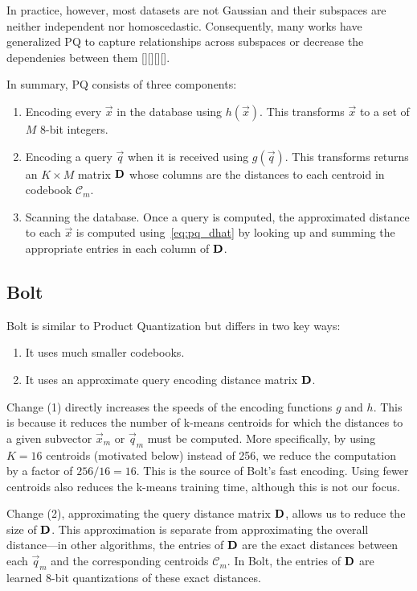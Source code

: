 In practice, however, most datasets are not Gaussian and their subspaces are neither independent nor homoscedastic. Consequently, many works have generalized PQ to capture relationships across subspaces or decrease the dependenies between them [][][][].

In summary, PQ consists of three components:
\begin{enumerate}
    \item Encoding every $\vec{x}$ in the database using $h(\vec{x})$. This transforms $\vec{x}$ to a set of $M$ 8-bit integers.
    \item Encoding a query $\vec{q}$ when it is received using $g(\vec{q})$. This transforms returns an $K \times M$ matrix $\mathbf{D}$ whose columns are the distances to each centroid in codebook $\mathcal{C}_m$.
    \item Scanning the database. Once a query is computed, the approximated distance to each $\vec{x}$ is computed using~\ref{eq:pq_dhat} by looking up and summing the appropriate entries in each column of $\mathbf{D}$.
\end{enumerate}

\subsection{Bolt}

Bolt is similar to Product Quantization but differs in two key ways:
\begin{enumerate}
\item It uses much smaller codebooks.
\item It uses an approximate query encoding distance matrix $\mathbf{D}$.
\end{enumerate}

Change (1) directly increases the speeds of the encoding functions $g$ and $h$. This is because it reduces the number of k-means centroids for which the distances to a given subvector $\vec{x}_m$ or $\vec{q}_m$ must be computed. More specifically, by using $K = 16$ centroids (motivated below) instead of 256, we reduce the computation by a factor of $256 / 16 = 16$. This is the source of Bolt's fast encoding. Using fewer centroids also reduces the k-means training time, although this is not our focus.

Change (2), approximating the query distance matrix $\mathbf{D}$, allows us to reduce the size of $\mathbf{D}$. This approximation is separate from approximating the overall distance---in other algorithms, the entries of $\mathbf{D}$ are the exact distances between each $\vec{q}_m$ and the corresponding centroids $\mathcal{C}_m$. In Bolt, the entries of $\mathbf{D}$ are learned 8-bit quantizations of these exact distances.

